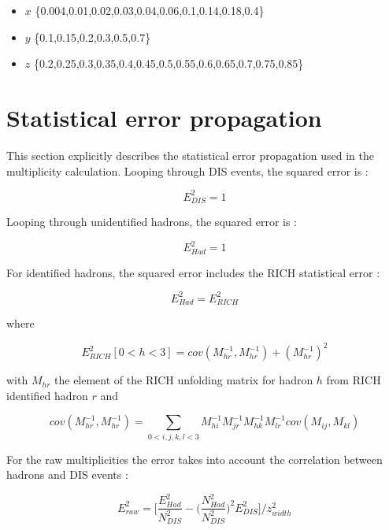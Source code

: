 \begin{itemize}
  \item $x$ \{0.004,0.01,0.02,0.03,0.04,0.06,0.1,0.14,0.18,0.4\}
  \item $y$ \{0.1,0.15,0.2,0.3,0.5,0.7\}
  \item $z$ \{0.2,0.25,0.3,0.35,0.4,0.45,0.5,0.55,0.6,0.65,0.7,0.75,0.85\}
\end{itemize}


\section{Statistical error propagation}

This section explicitly describes the statistical error propagation used in the multiplicity calculation. Looping through DIS events, the squared error is :

\begin{equation}
		E^2_{DIS} = 1
\end{equation}

Looping through unidentified hadrons, the squared error is :

\begin{equation}
		E^2_{Had} = 1
\end{equation}

For identified hadrons, the squared error includes the RICH statistical error :

\begin{equation}
		E^2_{Had} = E^2_{RICH}
\end{equation}

where

\begin{equation}
		E^2_{RICH}[0<h<3] = cov(M^{-1}_{hr},M^{-1}_{hr})+(M^{-1}_{hr})^2
\end{equation}

with $M_{hr}$ the element of the RICH unfolding matrix for hadron $h$ from RICH identified hadron $r$ and

\begin{equation}
		cov(M^{-1}_{hr},M^{-1}_{hr}) = \sum_{0<i,j,k,l<3} M^{-1}_{hi}M^{-1}_{jr}M^{-1}_{hk}M^{-1}_{lr}cov(M_{ij},M_{kl})
\end{equation}

For the raw multiplicities the error takes into account the correlation between hadrons and DIS events :

\begin{equation}
		E^2_{raw} = \Bigg[\frac{E^2_{Had}}{N^2_{DIS}} - \bigg( \frac{N^2_{Had}}{N^2_{DIS}} \bigg)^2 E^2_{DIS} \Bigg]/z^2_{width}
\end{equation}

